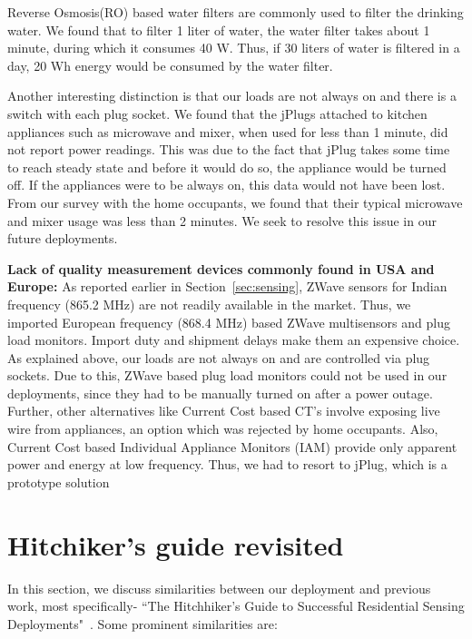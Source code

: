 \documentclass[10pt]{sensys-proc}
\newcommand{\secref}[1]{Section~\ref{#1}}
\begin{document}
\noindent Reverse Osmosis(RO) based water filters are commonly used to filter the drinking water. We found that to filter 1 liter of water, the water filter takes about 1 minute, during which it consumes 40 W. Thus, if 30 liters of water is filtered in a day, 20 Wh energy would be consumed by the water filter.

\noindent Another interesting distinction is that our loads are not always on and there is a switch with each plug socket. We found that the jPlugs attached to kitchen appliances such as microwave and mixer, when used for less than 1 minute, did not report power readings. This was due to the fact that jPlug takes some time to reach steady state and before it would do so, the appliance would be turned off. If the appliances were to be always on, this data would not have been lost. From our survey with the home occupants, we found that their typical microwave and mixer usage was less than 2 minutes. We seek to resolve this issue in our future deployments.

\noindent \textbf{Lack of quality measurement devices commonly found in USA and Europe:} As reported earlier in \secref{sec:sensing}, ZWave sensors for Indian frequency (865.2 MHz) are not readily available in the market. Thus, we imported European frequency (868.4 MHz) based ZWave multisensors and plug load monitors. Import duty and shipment delays make them an expensive choice. As explained above, our loads are not always on and are controlled via plug sockets. Due to this, ZWave based plug load monitors could not be used in our deployments, since they had to be manually turned on after a power outage. Further, other alternatives like Current Cost based CT's involve exposing live wire from appliances, an option which was rejected by home occupants. Also, Current Cost based Individual Appliance Monitors (IAM) provide only apparent power and energy at low frequency. Thus, we had to resort to jPlug, which is a prototype solution

\section{Hitchiker's guide revisited}
\label{sec:common}
In this section, we discuss similarities between our deployment and previous work, most specifically- ``The Hitchhiker’s Guide to Successful Residential Sensing Deployments"~\cite{hitchhiker_residential}. Some prominent similarities are:
\end{document}
